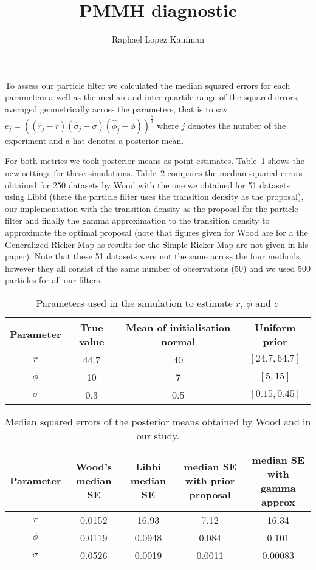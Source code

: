 \documentclass{article}
\title{PMMH diagnostic}
\author{Raphael Lopez Kaufman}
\date{}
\begin{document}
To assess our particle filter we calculated the median squared errors for each parameters a well as the median and inter-quartile range of the squared errors, averaged geometrically across the parameters, that is to say $e_j = ((\hat{r}_j-r)(\hat{\sigma}_j-\sigma)(\hat{\phi}_j-\phi))^\frac{1}{3}$ where $j$ denotes the number of the experiment and a hat denotes a posterior mean.

For both metrics we took posterior means as point estimates.
Table~\ref{table:new} shows the new settings for these simulations. Table~\ref{table:msecomp} compares the median squared errors obtained for 250 datasets by Wood with the one we obtained for 51 datasets using Libbi (there the particle filter uses the transition density as the proposal), our implementation with the transition density as the proposal for the particle filter and finally the gamma approximation to the transition density to approximate the optimal proposal (note that figures given for Wood are for a the Generalized Ricker Map as results for the Simple Ricker Map are not given in his paper). Note that these 51 datasets were not the same across the four methods, however they all consist of the same number of observations (50) and we used 500 particles for all our filters.

	\begin{table}[htb]
		\centering
		\vspace{5mm}
		\begin{tabular}{c|c|c|c}
			Parameter & True value &  Mean of initialisation normal &  Uniform prior \\ \hline
			$r$ & 44.7 & 40 & $[24.7, 64.7]$\\ \hline
			$\phi$ & 10 & 7 & $[5, 15]$\\ \hline
			$\sigma$ & 0.3 &  0.5 & $[0.15, 0.45]$\\ \hline
		\end{tabular}
		\caption{Parameters used in the simulation to estimate $r$, $\phi$ and $\sigma$}
		\label{table:new}
		\vspace{5mm}
	\end{table}
	
	\begin{table}[htb]
		\centering
		\begin{tabular}{c|c|c|c|c}
			Parameter & Wood's median SE & Libbi median SE & median SE with prior proposal & median SE with gamma approx\\ \hline
			$r$ & 0.0152 & 16.93 & 7.12 & 16.34 \\ \hline
			$\phi$ & 0.0119 & 0.0948 & 0.084 & 0.101 \\ \hline
			$\sigma$ & 0.0526 & 0.0019 & 0.0011 & 0.00083  \\ \hline
		\end{tabular}
		\caption{Median squared errors of the posterior means obtained by Wood and in our study.}
		\label{table:msecomp}
		\vspace{5mm}
	\end{table}
	
\end{document}
